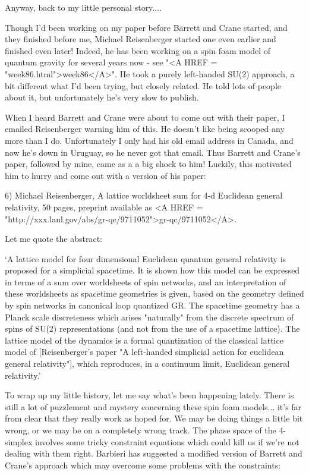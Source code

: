 Anyway, back to my little personal story.... 

Though I'd been working on my paper before Barrett and Crane started,
and they finished before me, Michael Reisenberger started one even 
earlier and finished even later!  Indeed, he has been working on a 
spin foam model of quantum gravity for several years now - see
"<A HREF = "week86.html">week86</A>".  He took a purely left-handed SU(2) approach, a bit different 
what I'd been trying, but closely related.  He told lots of people 
about it, but unfortunately he's very slow to publish.

When I heard Barrett and Crane were about to come out with their paper,
I emailed Reisenberger warning him of this.  He doesn't like being
scooped any more than I do.  Unfortunately I only had his old email
address in Canada, and now he's down in Uruguay, so he never got that
email.  Thus Barrett and Crane's paper, followed by mine, came as a
a big shock to him!  Luckily, this motivated him to hurry and come out
with a version of his paper:

6) Michael Reisenberger, A lattice worldsheet sum for 4-d Euclidean
general relativity, 50 pages, preprint available as <A HREF = "http://xxx.lanl.gov/abs/gr-qc/9711052">gr-qc/9711052</A>.

Let me quote the abstract:

  `A lattice model for four dimensional Euclidean quantum general
  relativity is proposed for a simplicial spacetime.  It is shown how this
  model can be expressed in terms of a sum over worldsheets of spin
  networks, and an interpretation of these worldsheets as spacetime
  geometries is given, based on the geometry defined by spin networks in
  canonical loop quantized GR. The spacetime geometry has a Planck scale
  discreteness which arises "naturally" from the discrete spectrum of
  spins of SU(2) representations (and not from the use of a spacetime
  lattice).  The lattice model of the dynamics is a formal quantization of
  the classical lattice model of [Reisenberger's paper "A left-handed
  simplicial action for euclidean general relativity"], which reproduces,
  in a continuum limit, Euclidean general relativity.'

To wrap up my little history, let me say what's been happening lately.
There is still a lot of puzzlement and mystery concerning these spin
foam models... it's far from clear that they really work as hoped for.
We may be doing things a little bit wrong, or we may be on a completely
wrong track.  The phase space of the 4-simplex involves some tricky
constraint equations which could kill us if we're not dealing with them
right.  Barbieri has suggested a modified version of Barrett and Crane's
approach which may overcome some problems with the constraints:

